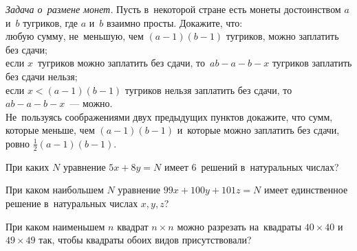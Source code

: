 


\begin{problems}

\item\emph{Задача о~размене монет.}
Пусть в~некоторой стране есть монеты достоинством $a$ и~$b$ тугриков, где $a$
и~$b$ взаимно просты.
Докажите, что:
\\
\subproblem
любую сумму, не~меньшую, чем $(a - 1) (b - 1)$ тугриков, можно заплатить без
сдачи;
\\
\subproblem
если $x$~тугриков можно заплатить без сдачи, то~$a b - a - b - x$ тугриков
заплатить без сдачи нельзя;
\\
\subproblem
если $x < (a - 1) (b - 1)$ тугриков нельзя заплатить без сдачи,
то~$ab - a - b - x$~--- можно.
\\
\subproblem
Не~пользуясь соображениями двух предыдущих пунктов докажите, что сумм, которые
меньше, чем $(a - 1) (b - 1)$ и~которые можно заплатить без сдачи,
ровно $\frac{1}{2} (a - 1) (b - 1)$. 

\item
При каких $N$ уравнение $5 x + 8 y = N$ имеет $6$~решений в~натуральных числах? 

\item
При каком наибольшем $N$ уравнение $99 x + 100 y + 101 z = N$ имеет
единственное решение в~натуральных числах $x, y, z$?

\item
При каком наименьшем $n$ квадрат $n \times n$ можно разрезать на~квадраты
$40 \times 40$ и~$49 \times 49$ так, чтобы квадраты обоих видов присутствовали?

\end{problems}

